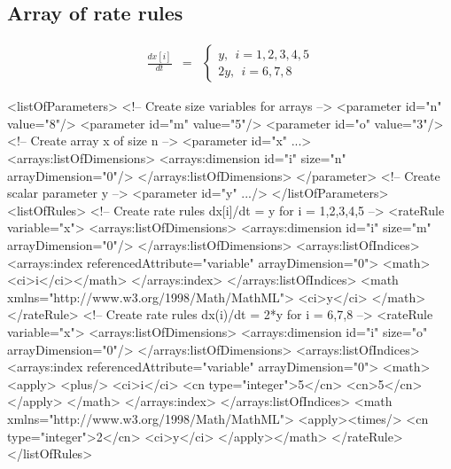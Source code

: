 

\subsection{Array of rate rules}

\begin{eqnarray*}
\frac{dx[i]}{dt} & = & \left\{ \begin{array}{l}
  y,~~i = 1,2,3,4,5 \\
 2y,~~i = 6, 7, 8 
\end{array}
\right.
\end{eqnarray*}
\begin{example}
<listOfParameters>
 <!-- Create size variables for arrays -->
 <parameter id="n" value="8"/>
 <parameter id="m" value="5"/>
 <parameter id="o" value="3"/>
 <!-- Create array x of size n -->
 <parameter id="x" ...> 
  <arrays:listOfDimensions>
   <arrays:dimension id="i" size="n" arrayDimension="0"/>
  </arrays:listOfDimensions>
 </parameter>
 <!-- Create scalar parameter y -->
 <parameter id="y" .../>
</listOfParameters>
<listOfRules>
 <!-- Create rate rules dx[i]/dt = y for i = 1,2,3,4,5 -->
 <rateRule variable="x">
  <arrays:listOfDimensions>
   <arrays:dimension id="i" size="m" arrayDimension="0"/>
  </arrays:listOfDimensions>
  <arrays:listOfIndices>
   <arrays:index referencedAttribute="variable" arrayDimension="0">
    <math><ci>i</ci></math>
   </arrays:index>
  </arrays:listOfIndices>
  <math xmlns="http://www.w3.org/1998/Math/MathML">
   <ci>y</ci>
  </math>
 </rateRule>
 <!-- Create rate rules dx(i)/dt = 2*y for i = 6,7,8 -->
 <rateRule variable="x">
  <arrays:listOfDimensions>
   <arrays:dimension id="i" size="o" arrayDimension="0"/>
  </arrays:listOfDimensions>
  <arrays:listOfIndices>
   <arrays:index referencedAttribute="variable" arrayDimension="0">
    <math>
    <apply>
      <plus/>
       <ci>i</ci>
       <cn type="integer">5</cn>
       <cn>5</cn>
     </apply>
    </math>
   </arrays:index>
  </arrays:listOfIndices>
  <math xmlns="http://www.w3.org/1998/Math/MathML">
  <apply><times/>
   <cn type="integer">2</cn> <ci>y</ci>
  </apply></math> 
 </rateRule>
</listOfRules>
\end{example}


